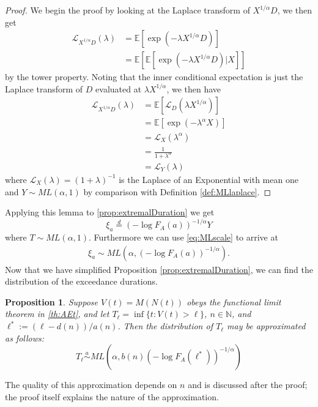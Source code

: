 \documentclass[honours,12pt]{unswthesis}
\newcommand{\E}{\mathbb{E}}
\newcommand{\1}{\mathbf 1}
\newtheorem{proposition}[equation]{Proposition}
\numberwithin{equation}{section}
\theoremstyle{definition}
\theoremstyle{remark}
\begin{document}
\begin{proof}
We begin the proof by looking at the Laplace transform of $X^{1/\alpha}D$, we then get
\begin{align*}
\mathcal{L}_{X^{1/\alpha}D}(\lambda)&=\E[\exp(-\lambda X^{1/\alpha}D)]\\
									 &=\E[\E[\exp(-\lambda X^{1/\alpha}D)|X]]
\end{align*}
by the tower property. Noting that the inner conditional expectation is just the Laplace transform of $D$ evaluated at $\lambda X^{1/\alpha}$, we then have
\begin{align*}
\mathcal{L}_{X^{1/\alpha}D}(\lambda)&=\E[\mathcal{L}_D(\lambda X^{1/\alpha})]\\
									 &=\E[\exp(-\lambda^\alpha X)]\\
									 &=\mathcal{L}_X(\lambda^\alpha)\\
									 &=\frac{1}{1+\lambda^\alpha}\\
									 &=\mathcal{L}_Y(\lambda)
\end{align*}
where $\mathcal{L}_X(\lambda)=(1+\lambda)^{-1}$ is the Laplace of an Exponential with mean one and $Y\sim ML(\alpha,1)$ by comparison with Definition \ref{def:MLlaplace}.
\end{proof}
\noindent Applying this lemma to \ref{prop:extremalDuration} we get
\[
	\xi_a \overset{d}{=} (-\log F_A(a))^{-1/\alpha}Y
\]
where $T\sim ML(\alpha,1)$. Furthermore we can use \ref{eq:MLscale} to arrive at
\begin{align}\label{eq:extremalDurationFinal}
 	\xi_a \sim ML\left(\alpha,(-\log F_A(a))^{-1/\alpha}\right).
\end{align}
Now that we have simplified Proposition \ref{prop:extremalDuration}, we can find the distribution of the exceedance durations.

\begin{proposition}\label{th:MLdist}
Suppose $V(t)=M(N(t))$ obeys the functional limit theorem in \ref{th:AEt}, and let 
$T_\ell=\inf\{t: V(t) > \ell\}$, 
$n \in \mathbb N$, 
and $\ell^* := (\ell - d(n))/ a(n)$. 
Then the distribution of $T_\ell$ may be approximated as follows: 
	\[ \label{eq:distT}
		T_\ell\overset{a}{\sim}ML\left(\alpha, b(n)(-\log F_A(\ell^*))^{-1/\alpha}\right)
	\]
\end{proposition}

The quality of this approximation depends on $n$ and is discussed after 
the proof; the proof itself explains the nature of the approximation.
\end{document}
